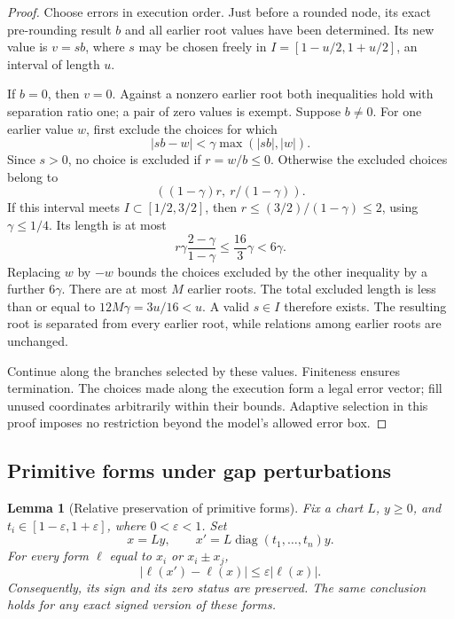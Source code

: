 \documentclass[11pt,a4paper]{article}
\newtheorem{lemma}[theorem]{Lemma}
\theoremstyle{definition}
\theoremstyle{remark}
\newcommand{\abs}[1]{\lvert #1\rvert}
\newcommand{\diag}{\operatorname{diag}}
\begin{document}
\begin{proof}
Choose errors in execution order. Just before a rounded node, its exact
pre-rounding result $b$ and all earlier root values have been determined. Its
new value is $v=sb$, where $s$ may be chosen freely in
$I=[1-u/2,1+u/2]$, an interval of length $u$.

If $b=0$, then $v=0$. Against a nonzero earlier root both inequalities hold
with separation ratio one; a pair of zero values is exempt. Suppose $b\ne0$.
For one earlier value $w$, first exclude the choices for which
\[
 \abs{sb-w}<\gamma\max(\abs{sb},\abs w).
\]
Since $s>0$, no choice is excluded if $r=w/b\le0$. Otherwise the excluded
choices belong to
\[
 ( (1-\gamma)r,\ r/(1-\gamma) ).
\]
If this interval meets $I\subset[1/2,3/2]$, then
$r\le(3/2)/(1-\gamma)\le2$, using $\gamma\le1/4$. Its length is at most
\[
 r\gamma\frac{2-\gamma}{1-\gamma}
 \le\frac{16}{3}\gamma<6\gamma.
\]
Replacing $w$ by $-w$ bounds the choices excluded by the other inequality
by a further $6\gamma$. There are at most $M$ earlier roots. The total excluded
length is less than or equal to $12M\gamma=3u/16<u$. A valid $s\in I$ therefore
exists. The resulting root is separated from every earlier root, while
relations among earlier roots are unchanged.

Continue along the branches selected by these values. Finiteness ensures
termination. The choices made along the execution form a legal error vector;
fill unused coordinates arbitrarily within their bounds. Adaptive selection
in this proof imposes no restriction beyond the model's allowed error box.
\end{proof}

\subsection{Primitive forms under gap perturbations}

\begin{lemma}[Relative preservation of primitive forms]\label{lem:primitive}
Fix a chart $L$, $y\ge0$, and $t_i\in[1-\varepsilon,1+\varepsilon]$, where
$0<\varepsilon<1$. Set
\[
 x=Ly,\qquad x'=L\diag(t_1,\ldots,t_n)y.
\]
For every form $\ell$ equal to $x_i$ or $x_i\pm x_j$,
\begin{equation}\label{eq:primitive}
 \abs{\ell(x')-\ell(x)}\le\varepsilon\abs{\ell(x)}.
\end{equation}
Consequently, its sign and its zero status are preserved. The same conclusion
holds for any exact signed version of these forms.
\end{lemma}
\end{document}
